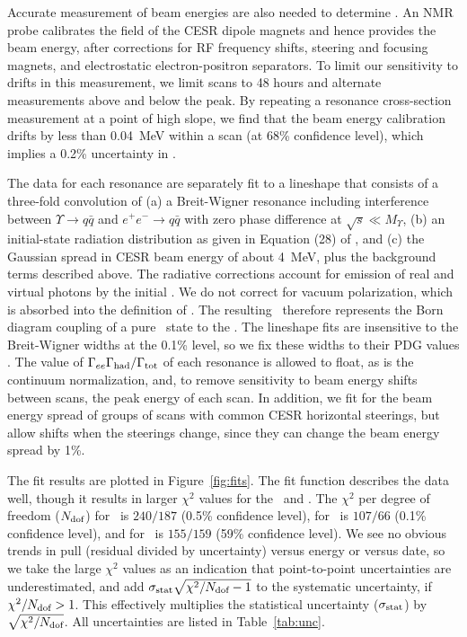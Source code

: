 \documentclass[aps,prl,twocolumn,superscriptaddress,showpacs,floatfix]{revtex4}
\begin{document}
Accurate measurement of beam energies are also needed to determine
\gee.  An NMR probe calibrates the field of the CESR dipole magnets
and hence provides the beam energy, after corrections for RF frequency
shifts, steering and focusing magnets, and electrostatic
electron-positron separators.  To limit our sensitivity to drifts in
this measurement, we limit scans to 48 hours and alternate
measurements above and below the peak.  By repeating a resonance
cross-section measurement at a point of high slope, we find that the
beam energy calibration drifts by less than 0.04~MeV within a scan (at
68\% confidence level), which implies a 0.2\% uncertainty in \gee.

The data for each resonance are separately fit to a lineshape that
consists of a three-fold convolution of (a) a Breit-Wigner resonance
including interference between $\Upsilon \to q\bar{q}$ and $e^+e^- \to
q\bar{q}$ with zero phase difference at $\sqrt{s} \ll M_\Upsilon$, (b)
an initial-state radiation distribution as given in Equation (28) of
\cite{kf}, and (c) the Gaussian spread in CESR beam energy of about
4~MeV, plus the background terms described above.  The radiative
corrections account for emission of real and virtual photons by the
initial \ee.  We do not correct for vacuum polarization, which is
absorbed into the definition of \gee.  The resulting \gee\ therefore
represents the Born diagram coupling of a pure \ee\ state to the \ups.
The lineshape fits are insensitive to the Breit-Wigner widths at the
0.1\% level, so we fix these widths to their PDG values \cite{pdg}.
The value of $\Gamma_{ee}\Gamma_{\mbox{\scriptsize had}}/\Gamma_{\mbox{\scriptsize tot}}$ of each resonance is allowed to float, as is
the continuum normalization, and, to remove sensitivity to beam energy
shifts between scans, the peak energy of each scan.  In addition, we
fit for the beam energy spread of groups of scans with common CESR
horizontal steerings, but allow shifts when the steerings change,
since they can change the beam energy spread by 1\%.

The fit results are plotted in Figure~\ref{fig:fits}.  The fit
function describes the data well, though it results in larger $\chi^2$
values for the \us\ and \uss.  The $\chi^2$ per degree of freedom
($N_{\mbox{\scriptsize dof}}$) for \us\ is $240/187$ (0.5\% confidence
level), for \uss\ is $107/66$ (0.1\% confidence level), and for \usss\
is $155/159$ (59\% confidence level).  We see no obvious trends in
pull (residual divided by uncertainty) versus energy or versus date,
so we take the large $\chi^2$ values as an indication that
point-to-point uncertainties are underestimated, and add
$\sigma_{\mbox{\scriptsize stat}}\sqrt{\chi^2/N_{\mbox{\scriptsize
dof}} - 1}$ to the systematic uncertainty, if
$\chi^2/N_{\mbox{\scriptsize dof}} > 1$.  This effectively multiplies
the statistical uncertainty ($\sigma_{\mbox{\scriptsize stat}}$) by
$\sqrt{\chi^2/N_{\mbox{\scriptsize dof}}}$.  All uncertainties are
listed in Table~\ref{tab:unc}.
\end{document}

